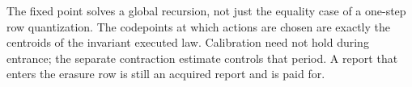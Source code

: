 The fixed point solves a global recursion, not just the equality case of a one-step row quantization. The codepoints at which actions are chosen are exactly the centroids of the invariant executed law. Calibration need not hold during entrance; the separate contraction estimate controls that period. A report that enters the erasure row is still an acquired report and is paid for.
